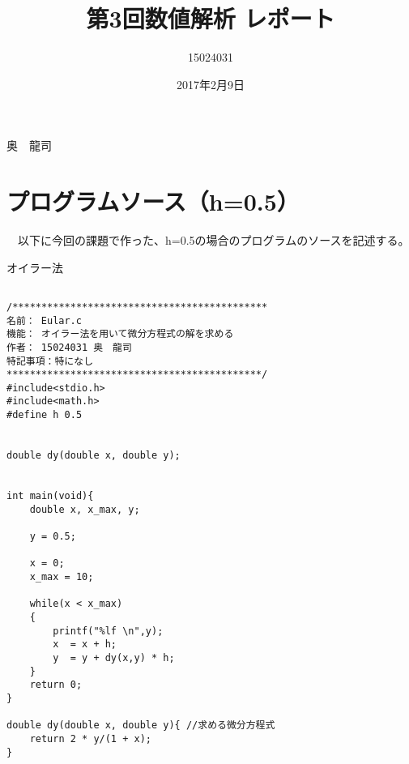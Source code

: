 \documentclass[a4j,titlepage]{jarticle}
\begin{document}

\title{第3回数値解析 レポート}

\author{15024031}{奥　龍司}

\date{2017年2月9日}
\maketitle



\section{プログラムソース（h=0.5）}
　以下に今回の課題で作った、h=0.5の場合のプログラムのソースを記述する。
 
 \begin{breakitembox}[l]{オイラー法} \small
\begin{verbatim}

/********************************************
名前： Eular.c
機能： オイラー法を用いて微分方程式の解を求める
作者： 15024031 奥　龍司
特記事項：特になし
********************************************/
#include<stdio.h>
#include<math.h>
#define h 0.5


double dy(double x, double y);


int main(void){
    double x, x_max, y;
    
    y = 0.5;
    
    x = 0;
    x_max = 10;
    
    while(x < x_max)
    {
        printf("%lf \n",y);
        x  = x + h;
        y  = y + dy(x,y) * h;
    }
    return 0;
}

double dy(double x, double y){ //求める微分方程式
    return 2 * y/(1 + x);
}


\end{verbatim}
\end{breakitembox}
\end{document}
